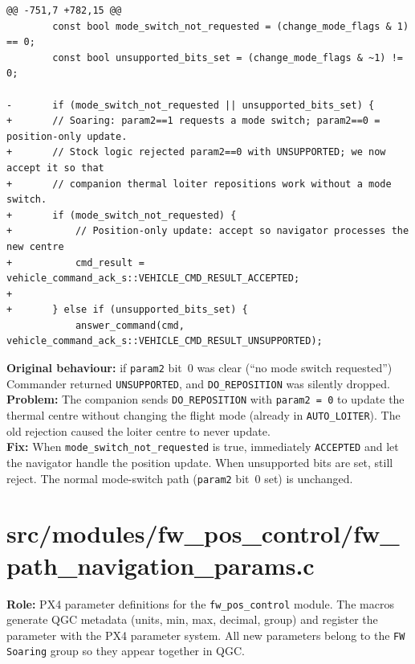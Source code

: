 \documentclass[12pt,a4paper]{article}
\begin{document}
\begin{lstlisting}[style=diff]
@@ -751,7 +782,15 @@
		const bool mode_switch_not_requested = (change_mode_flags & 1) == 0;
		const bool unsupported_bits_set = (change_mode_flags & ~1) != 0;

-		if (mode_switch_not_requested || unsupported_bits_set) {
+		// Soaring: param2==1 requests a mode switch; param2==0 = position-only update.
+		// Stock logic rejected param2==0 with UNSUPPORTED; we now accept it so that
+		// companion thermal loiter repositions work without a mode switch.
+		if (mode_switch_not_requested) {
+			// Position-only update: accept so navigator processes the new centre
+			cmd_result = vehicle_command_ack_s::VEHICLE_CMD_RESULT_ACCEPTED;
+
+		} else if (unsupported_bits_set) {
			answer_command(cmd, vehicle_command_ack_s::VEHICLE_CMD_RESULT_UNSUPPORTED);
\end{lstlisting}
\begin{annotation}
\textbf{Original behaviour:} if \texttt{param2} bit~0 was clear (``no mode switch requested'') Commander returned \texttt{UNSUPPORTED}, and \texttt{DO\_REPOSITION} was silently dropped.\\
\textbf{Problem:} The companion sends \texttt{DO\_REPOSITION} with \texttt{param2 = 0} to update the thermal centre without changing the flight mode (already in \texttt{AUTO\_LOITER}). The old rejection caused the loiter centre to never update.\\
\textbf{Fix:} When \texttt{mode\_switch\_not\_requested} is true, immediately \texttt{ACCEPTED} and let the navigator handle the position update. When unsupported bits are set, still reject. The normal mode-switch path (\texttt{param2} bit~0 set) is unchanged.
\end{annotation}

\section{src/modules/fw\_pos\_control/fw\_path\_navigation\_params.c}

\begin{annotation}
\textbf{Role:} PX4 parameter definitions for the \texttt{fw\_pos\_control} module. The macros generate QGC metadata (units, min, max, decimal, group) and register the parameter with the PX4 parameter system. All new parameters belong to the \texttt{FW Soaring} group so they appear together in QGC.
\end{annotation}
\end{document}
